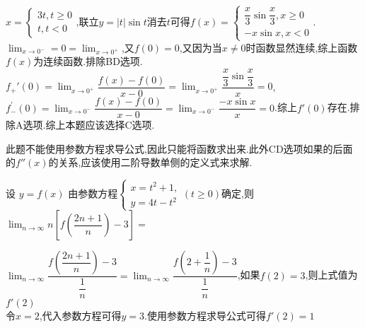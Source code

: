 \documentclass[8pt a4paper, oneside, UTF8]{ctexbook}  %
\begin{document}
\begin{sloppypar}
\begin{problem}
    \end{problem}
    \begin{solution}
        $x=\begin{cases}
                3t,t \geq 0 \\
                t,t<0
            \end{cases}$,联立$y=|t|\sin t$消去$t$可得$f(x)=\begin{cases}
                \dfrac{x}{3}\sin \dfrac{x}{3} ,x\geq 0 \\
                -x\sin x, x < 0
            \end{cases}$.
        $\lim_{x\to 0^-}=0=\lim_{x\to 0^+}$,又$f(0)=0$,又因为当$x\neq0$时函数显然连续,综上函数$f(x)$为连续函数.排除BD选项.$ f_+'(0)=\lim_{x\to 0^+} \dfrac{f(x)-f(0)}{x-0}=\lim_{x\to 0^+}\dfrac{\dfrac{x}{3}\sin\dfrac{x}{3}}{x}=0$,$f_{-}^{\prime}(0)=\lim_{x\to0^{-}}\dfrac{f(x)-f(0)}{x-0}=\lim_{x\to0^{-}}\dfrac{-x\sin x}{x}=0$.综上$f'(0)$存在.排除A选项.综上本题应该选择C选项.
    \end{solution}
    \begin{note}
        此题不能使用参数方程求导公式,因此只能将函数求出来.此外CD选项如果的后面的$f''(x)$的关系,应该使用二阶导数单侧的定义式来求解.
    \end{note}
    \begin{problem}
    设 $y=f(x)$ 由参数方程$\begin{cases}x=t^2+1,\\y=4t-t^2\end{cases}(t\geqslant0)$确定,则$\lim_{n\to\infty} n\left[f\left(\dfrac{2n+1}n\right)-3\right]=$
    \end{problem}
    \begin{solution}
        $\lim_{n \to \infty}\dfrac{f(\dfrac{2n+1}{n})-3}{\dfrac1n}=\lim_{n \to \infty}\dfrac{f(2+\dfrac{1}{n})-3}{\dfrac{1}{n}}$,如果$f(2)=3$,则上式值为$f'(2)$\\
        令$x=2$,代入参数方程可得$y=3$.使用参数方程求导公式可得$f'(2)=1$
    \end{solution}

\end{sloppypar}
\end{document}
